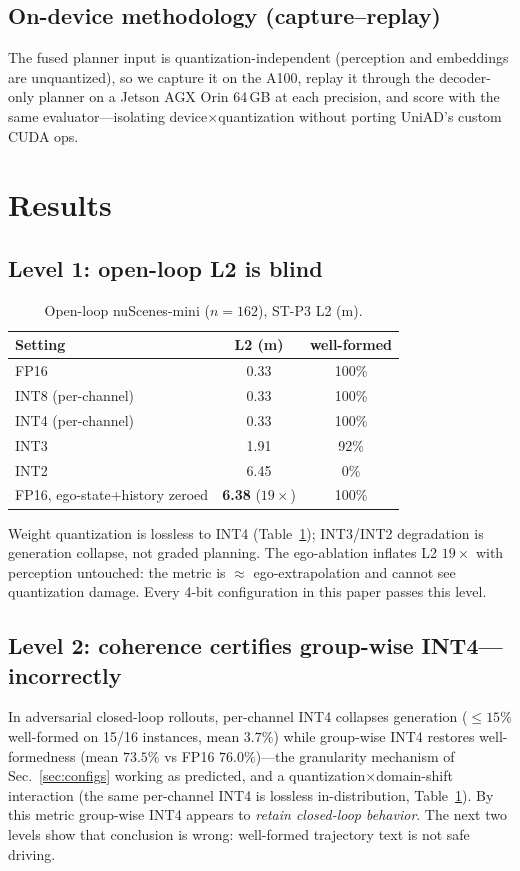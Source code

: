 \documentclass[conference]{IEEEtran}
\begin{document}
\subsection{On-device methodology (capture--replay)}
\label{sec:replay}
The fused planner input is quantization-independent (perception and embeddings are
unquantized), so we capture it on the A100, replay it through the decoder-only planner on a
Jetson AGX Orin 64\,GB at each precision, and score with the same evaluator---isolating
device$\times$quantization without porting UniAD's custom CUDA ops.

\section{Results}
\subsection{Level 1: open-loop L2 is blind}
\begin{table}[t]\centering
\caption{Open-loop nuScenes-mini ($n{=}162$), ST-P3 L2 (m).}
\label{tab:openloop}
\begin{tabular}{lcc}
\toprule
Setting & L2 (m) & well-formed \\
\midrule
FP16 & 0.33 & 100\% \\
INT8 (per-channel) & 0.33 & 100\% \\
INT4 (per-channel) & 0.33 & 100\% \\
INT3 & 1.91 & 92\% \\
INT2 & 6.45 & 0\% \\
\midrule
FP16, ego-state+history zeroed & \textbf{6.38} ($19\times$) & 100\% \\
\bottomrule
\end{tabular}
\end{table}
Weight quantization is lossless to INT4 (Table~\ref{tab:openloop}); INT3/INT2 degradation is
generation collapse, not graded planning. The ego-ablation inflates L2 $19\times$ with
perception untouched: the metric is $\approx$ ego-extrapolation and cannot see quantization
damage. Every 4-bit configuration in this paper passes this level.

\subsection{Level 2: coherence certifies group-wise INT4---incorrectly}
\label{sec:coherence}
In adversarial closed-loop rollouts, per-channel INT4 collapses generation ($\le15\%$
well-formed on 15/16 instances, mean $3.7\%$) while group-wise INT4 restores well-formedness
(mean $73.5\%$ vs FP16 $76.0\%$)---the granularity mechanism of Sec.~\ref{sec:configs}
working as predicted, and a quantization$\times$domain-shift interaction (the same
per-channel INT4 is lossless in-distribution, Table~\ref{tab:openloop}). By this metric
group-wise INT4 appears to \emph{retain closed-loop behavior}. The next two levels show that
conclusion is wrong: well-formed trajectory text is not safe driving.
\end{document}
